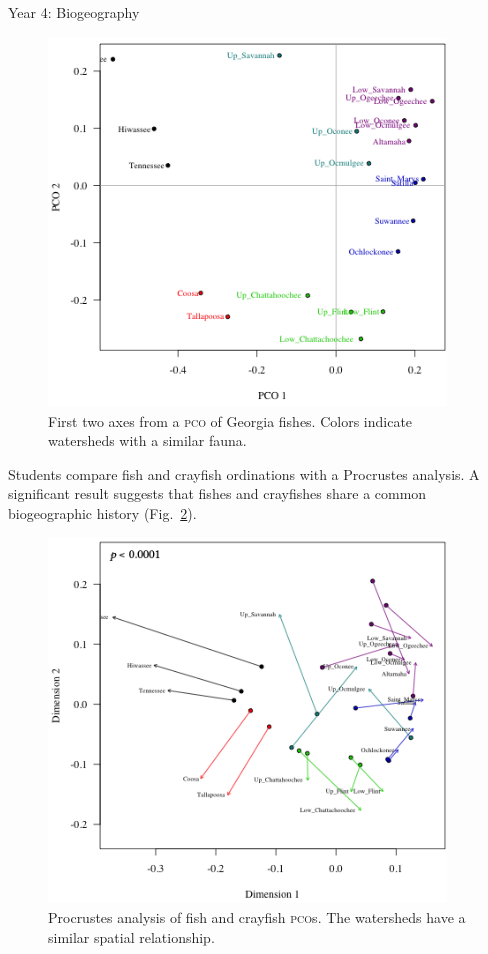 \documentclass[final,hyperref={pdfpagelabels=false}]{beamer}
\newlength{\onecolwid}
\begin{document}
\begin{frame}[t]
\begin{columns}[t]
\begin{column}{\onecolwid}
\begin{block}{Year 4: Biogeography}
			\begin{figure}
				\includegraphics[width=0.94\textwidth]{fishes_pco}
				\caption{First two axes from a \textsc{pco} of Georgia fishes. Colors indicate watersheds with a similar fauna.\label{fig:pco}}
			\end{figure}
			
			Students compare fish and crayfish ordinations with a Procrustes analysis. A significant result suggests that fishes and crayfishes share a common biogeographic history (Fig.~\ref{fig:procrustes}). 
			
			\begin{figure}
				\includegraphics[width=0.94\textwidth]{procrustes}
				\caption{Procrustes analysis of fish and crayfish \textsc{pco}s. The watersheds have a similar spatial relationship.\label{fig:procrustes}}
			\end{figure}
			

\end{block}
\end{column}
\end{columns}
\end{frame}
\end{document}
